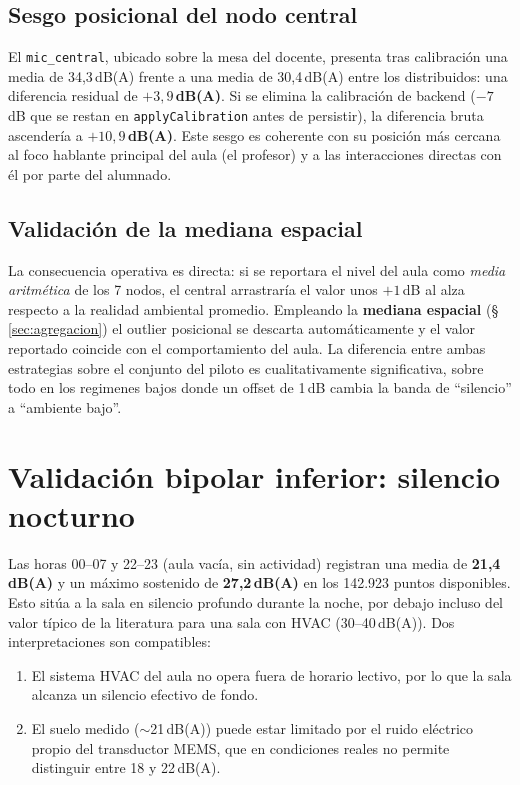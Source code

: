 \documentclass[11pt,a4paper,openany]{report}
\begin{document}
\subsection*{Sesgo posicional del nodo central}

El \texttt{mic\_central}, ubicado sobre la mesa del docente, presenta tras calibraci\'on una media de 34,3\,dB(A) frente a una media de 30,4\,dB(A) entre los distribuidos: una diferencia residual de \textbf{$+3{,}9$\,dB(A)}. Si se elimina la calibraci\'on de backend ($-7$\,dB que se restan en \texttt{applyCalibration} antes de persistir), la diferencia bruta ascender\'ia a \textbf{$+10{,}9$\,dB(A)}. Este sesgo es coherente con su posici\'on m\'as cercana al foco hablante principal del aula (el profesor) y a las interacciones directas con \'el por parte del alumnado.

\subsection*{Validaci\'on de la mediana espacial}

La consecuencia operativa es directa: si se reportara el nivel del aula como \emph{media aritm\'etica} de los 7 nodos, el central arrastrar\'ia el valor unos \mbox{$+1$\,dB} al alza respecto a la realidad ambiental promedio. Empleando la \textbf{mediana espacial} (\S\,\ref{sec:agregacion}) el outlier posicional se descarta autom\'aticamente y el valor reportado coincide con el comportamiento del aula. La diferencia entre ambas estrategias sobre el conjunto del piloto es cualitativamente significativa, sobre todo en los regimenes bajos donde un offset de 1\,dB cambia la banda de ``silencio'' a ``ambiente bajo''.

\section{Validaci\'on bipolar inferior: silencio nocturno}
\label{sec:val-inferior}

Las horas 00--07 y 22--23 (aula vac\'ia, sin actividad) registran una media de \textbf{21,4\,dB(A)} y un m\'aximo sostenido de \textbf{27,2\,dB(A)} en los 142.923 puntos disponibles. Esto sit\'ua a la sala en silencio profundo durante la noche, por debajo incluso del valor t\'ipico de la literatura para una sala con HVAC (30--40\,dB(A)). Dos interpretaciones son compatibles:

\begin{enumerate}
    \item El sistema HVAC del aula no opera fuera de horario lectivo, por lo que la sala alcanza un silencio efectivo de fondo.
    \item El suelo medido ($\sim$21\,dB(A)) puede estar limitado por el ruido el\'ectrico propio del transductor MEMS, que en condiciones reales no permite distinguir entre 18 y 22\,dB(A).
\end{enumerate}
\end{document}
